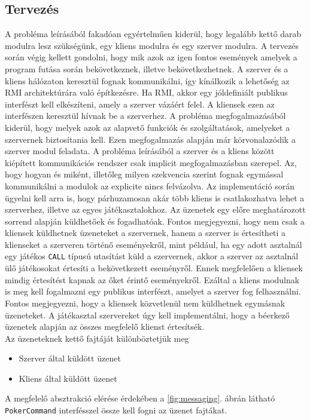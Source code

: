 \subsection{Tervezés}
A probléma leírásából fakadóan egyértelműen kiderül, hogy legalább kettő darab modulra lesz szükségünk, egy kliens modulra és egy szerver modulra. 
A tervezés során végig kellett gondolni, hogy mik azok az igen fontos események amelyek a program futása során bekövetkeznek, illetve bekövetkezhetnek. A szerver és a kliens hálózaton keresztül fognak kommunikálni, így kínálkozik a lehetőség az RMI architektúrára való építkezésre. Ha RMI, akkor egy jóldefiniált publikus interfészt kell elkészíteni, amely a szerver vázáért felel. A kliensek ezen az interfészen keresztül hívnak be a szerverhez. A probléma megfogalmazásából kiderül, hogy melyek azok az alapvető funkciók és szolgáltatások, amelyeket a szervernek biztosítania kell. Ezen megfogalmazás alapján már körvonalazódik a szerver modul feladata. A probléma leírásából a szerver és a kliens között kiépített kommunikációs rendszer csak implicit megfogalmazásban szerepel. Az, hogy hogyan és miként, illetőleg milyen szekvencia szerint fognak egymással kommunikálni a modulok az explicite nincs felvázolva. Az implementáció során ügyelni kell arra is, hogy párhuzamosan akár több kliens is csatlakozhatva lehet a szerverhez, illetve az egyes játékasztalokhoz. Az üzenetek egy előre meghatározott sorrend alapján küldhetőek és fogadhatóak. Fontos megjegyezni, hogy nem csak a kliensek küldhetnek üzeneteket a szervernek, hanem a szerver is értesítheti a klienseket a szerveren történő eseményekről, mint például, ha egy adott asztalnál egy játékos \texttt{CALL} típusú utasítást küld a szervernek, akkor a szerver az asztalnál ülő játékosokat értesíti a bekövetkezett eseményről. Ennek megfelelően a kliensek mindig értesítést kapnak az őket érintő eseményekről. Ezáltal a kliens modulnak is meg kell fogalmazni egy publikus interfészt, amelyet a szerver fog felhasználni. Fontos megjegyezni, hogy a kliensek közvetlenül nem küldhetnek egymásnak üzeneteket. A játékasztal szervereket úgy kell implementálni, hogy a béerkező üzenetek alapján az összes megfelelő klienst értesítsék. \\
Az üzeneteknek kettő fajtáját különböztetjük meg
 \begin{itemize}[leftmargin=2.7cm]
\item Szerver által küldött üzenet
\item Kliens által küldött üzenet
\end{itemize}
A megfelelő absztrakció elérése érdekében a \ref{fig:messaging}. ábrán látható \texttt{PokerCommand} interfésszel össze kell fogni az üzenet fajtákat.

